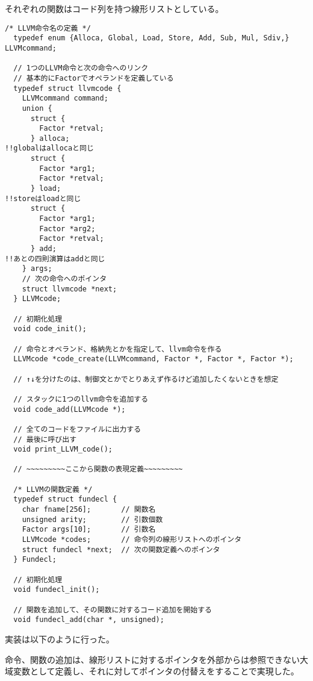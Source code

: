 それぞれの関数はコード列を持つ線形リストとしている。
\begin{lstlisting}[caption={llvm.h},label={llvm.h}]
  /* LLVM命令名の定義 */
  typedef enum {Alloca, Global, Load, Store, Add, Sub, Mul, Sdiv,} LLVMcommand;
  
  // 1つのLLVM命令と次の命令へのリンク
  // 基本的にFactorでオペランドを定義している
  typedef struct llvmcode {
    LLVMcommand command;
    union {
      struct {
        Factor *retval;
      } alloca;
!!globalはallocaと同じ
      struct {
        Factor *arg1;
        Factor *retval;
      } load;
!!storeはloadと同じ
      struct {
        Factor *arg1;
        Factor *arg2;
        Factor *retval;
      } add;
!!あとの四則演算はaddと同じ
    } args;
    // 次の命令へのポインタ
    struct llvmcode *next;
  } LLVMcode;
  
  // 初期化処理
  void code_init();

  // 命令とオペランド、格納先とかを指定して、llvm命令を作る
  LLVMcode *code_create(LLVMcommand, Factor *, Factor *, Factor *);
  
  // ↑↓を分けたのは、制御文とかでとりあえず作るけど追加したくないときを想定
  
  // スタックに1つのllvm命令を追加する
  void code_add(LLVMcode *);
  
  // 全てのコードをファイルに出力する
  // 最後に呼び出す
  void print_LLVM_code();
  
  // ~~~~~~~~~ここから関数の表現定義~~~~~~~~~
  
  /* LLVMの関数定義 */
  typedef struct fundecl {
    char fname[256];       // 関数名
    unsigned arity;        // 引数個数
    Factor args[10];       // 引数名
    LLVMcode *codes;       // 命令列の線形リストへのポインタ
    struct fundecl *next;  // 次の関数定義へのポインタ
  } Fundecl;
  
  // 初期化処理
  void fundecl_init();
  
  // 関数を追加して、その関数に対するコード追加を開始する
  void fundecl_add(char *, unsigned); 
\end{lstlisting}


実装は以下のように行った。

命令、関数の追加は、線形リストに対するポインタを外部からは参照できない大域変数として定義し、それに対してポインタの付替えをすることで実現した。

